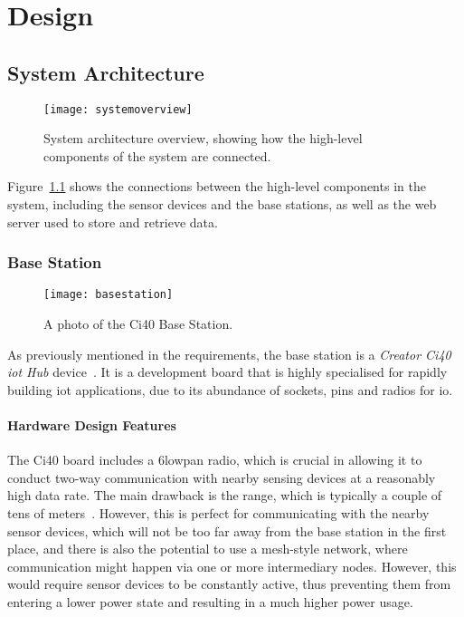 \chapter{Design}

\section{System Architecture}

\begin{figure}[h]
  \label{overviewfigure}
  \centering
  \texttt{[image: systemoverview]}
  \caption{System architecture overview, showing how the high-level components of the system are connected.}
\end{figure}

Figure~\ref{overviewfigure} shows the connections between the high-level
components in the system, including the sensor devices and the base
stations, as well as the web server used to store and retrieve data.

\subsection{Base Station}
\begin{figure}
  \label{fig:basestation}
  \centering
  \texttt{[image: basestation]}
  \caption{A photo of the Ci40 Base Station.}
\end{figure}
As previously mentioned in the requirements, the base station is a
\textit{Creator Ci40 \acrshort{iot} Hub} device~\cite{creatorci40}. It is a
development board that is highly specialised for rapidly building
\acrlong{iot} applications, due to its abundance of sockets, pins and radios
for \acrshort{io}.

\subsubsection{Hardware Design Features}

The Ci40 board includes a \gls{6lowpan} radio, which is crucial in allowing
it to conduct two-way communication with nearby sensing devices at a
reasonably high data rate. The main drawback is the range, which is typically
a couple of tens of meters~\cite{culler20096lowpan}. However, this is perfect
for communicating with the nearby sensor devices, which will not be too far
away from the base station in the first place, and there is also the
potential to use a mesh-style network, where communication might happen via
one or more intermediary nodes. However, this would require sensor devices to
be constantly active, thus preventing them from entering a lower power state
and resulting in a much higher power usage.


